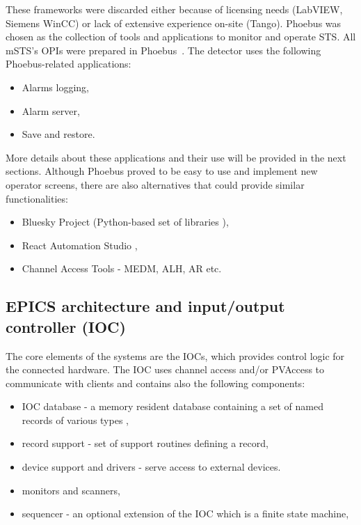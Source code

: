  These frameworks were discarded either because of licensing needs (LabVIEW, Siemens WinCC) or lack of extensive experience on-site (Tango). Phoebus \cite{Phoebus} was chosen as the collection of tools and applications to monitor and operate \gls{STS}. All \gls{mSTS}'s \glspl{OPI} were prepared in Phoebus~\cite{Phoebus}. The detector uses the following Phoebus-related applications:
\begin{itemize}
    \item Alarms logging,
    \item Alarm server,
    \item Save and restore.
\end{itemize}
More details about these applications and their use will be provided in the next sections. Although Phoebus proved to be easy to use and implement new operator screens, there are also alternatives that could provide similar functionalities:
\begin{itemize}
    \item Bluesky Project (Python-based set of libraries \cite{Bluesky}),
    \item React Automation Studio \cite{React},
    \item Channel Access Tools - MEDM, \gls{ALH}, \gls{AR} etc. 
\end{itemize}

\subsection{EPICS architecture and input/output controller (IOC)}
The core elements of the systems are the \glspl{IOC}, which provides control logic for the connected hardware. The \gls{IOC} uses channel access and/or PVAccess to communicate with clients and contains also the following components\cite{IOC}:
\begin{itemize}
    \item \gls{IOC} database -  a memory resident database containing a set of named records of various types \cite{IOC2},
    \item record support - set of support routines defining a record,
    \item device support and drivers - serve access to external devices.
    \item monitors and scanners,
    \item sequencer - an optional extension of the \gls{IOC} which is a finite state machine,
\end{itemize}

